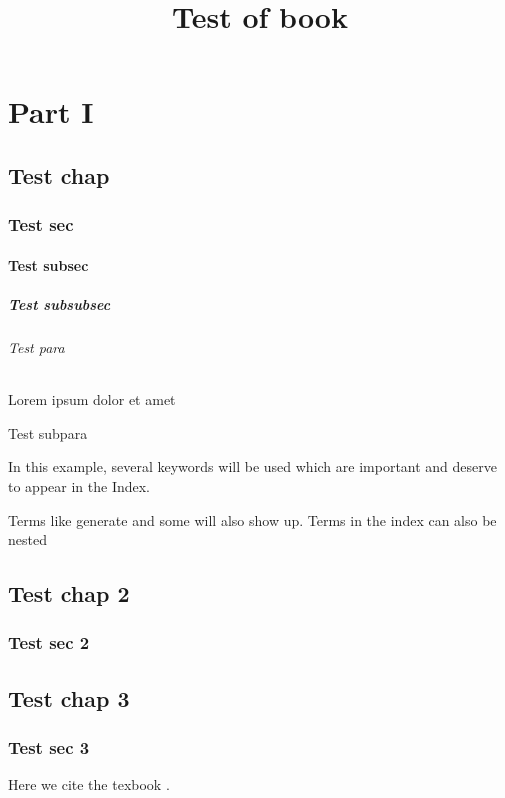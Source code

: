 \documentclass{book}
\title{Test of book}
\begin{document}
    \frontmatter
    \maketitle
    \tableofcontents
    \listoffigures
    \listoftables
    
    \part{Part I}
    \chapter{Test chap}
    \section{Test sec}
    \subsection{Test subsec}
    \subsubsection{Test subsubsec}
    \paragraph{Test para} Lorem ipsum dolor et amet
    \subparagraph{Test subpara}
    In this example, several keywords will be used 
    which are important and deserve to appear in the Index.
    
    Terms like generate and some will also 
    show up. Terms in the index can also be nested 
    
    \chapter{Test chap 2}
    \section{Test sec 2}
    
    \mainmatter
    \chapter{Test chap 3}
    \section{Test sec 3}
    Here we cite the texbook \cite{texbook}.
    
\end{document}
